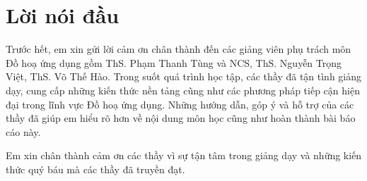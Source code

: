 \section*{Lời nói đầu}
Trước hết, em xin gửi lời cảm ơn chân thành đến các giảng viên phụ trách môn Đồ hoạ ứng dụng gồm ThS. Phạm Thanh Tùng và NCS, ThS. Nguyễn Trọng Việt, ThS. Võ Thế Hào. Trong suốt quá trình học tập, các thầy đã tận tình giảng dạy, cung cấp những kiến thức nền tảng cũng như các phương pháp tiếp cận hiện đại trong lĩnh vực Đồ hoạ ứng dụng. Những hướng dẫn, góp ý và hỗ trợ của các thầy đã giúp em hiểu rõ hơn về nội dung môn học cũng như hoàn thành bài báo cáo này.

Em xin chân thành cảm ơn các thầy vì sự tận tâm trong giảng dạy và những kiến thức quý báu mà các thầy đã truyền đạt.